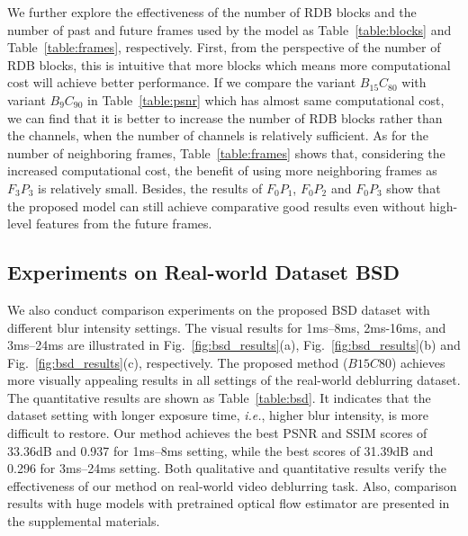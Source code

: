 \documentclass[twocolumn]{svjour3}          \smartqed  \usepackage{graphicx}
\begin{document}
We further explore the effectiveness of the number of RDB blocks and the number of past and future frames used by the model as Table~\ref{table:blocks} and Table~\ref{table:frames}, respectively. First, from the perspective of the number of RDB blocks, this is intuitive that more blocks which means more computational cost will achieve better performance. If we compare the variant $B_{15}C_{80}$ with variant $B_9C_{90}$ in Table~\ref{table:psnr} which has almost same computational cost, we can find that it is better to increase the number of RDB blocks rather than the channels, when the number of channels is relatively sufficient. As for the number of neighboring frames, Table~\ref{table:frames} shows that, considering the increased computational cost, the benefit of using more neighboring frames as $F_3P_3$ is relatively small. Besides, the results of $F_0P_1$, $F_0P_2$ and $F_0P_3$ show that the proposed model can still achieve comparative good results even without high-level features from the future frames.

\subsection{Experiments on Real-world Dataset BSD}

\begin{figure*}[!ht]
	\centering
{}
	\hfil
	\hfil
	\hfil
	\caption{Visual comparisons on different settings of the proposed BSD.}
	\label{fig:bsd_results}
\end{figure*}

We also conduct comparison experiments on the proposed BSD dataset with different blur intensity settings. The visual results for 1ms--8ms, 2ms-16ms, and 3ms--24ms are illustrated in Fig.~\ref{fig:bsd_results}(a), Fig.~\ref{fig:bsd_results}(b) and Fig.~\ref{fig:bsd_results}(c), respectively. The proposed method ($B15C80$) achieves more visually appealing results in all settings of the real-world deblurring dataset. The quantitative results are shown as Table~\ref{table:bsd}. It indicates that the dataset setting with longer exposure time, \textit{i.e.}, higher blur intensity, is more difficult to restore. Our method achieves the best PSNR and SSIM scores of 33.36dB and 0.937 for 1ms--8ms setting, while the best scores of 31.39dB and 0.296 for 3ms--24ms setting. Both qualitative and quantitative results verify the effectiveness of our method on real-world video deblurring task. Also, comparison results with huge models with pretrained optical flow estimator are presented in the supplemental materials.
\end{document}
